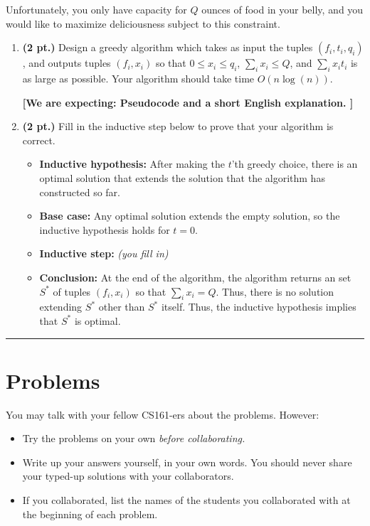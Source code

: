\documentclass{article}
\newcommand{\expecting}[1]{\noindent\textbf{[We are expecting: #1]}}
\newcommand{\pts}[1]{\textbf{(#1 pt.)}}
\begin{document}
\begin{enumerate}
Unfortunately, you only have capacity for $Q$ ounces of food in your belly, and you would like to maximize deliciousness subject to this constraint.  

\begin{enumerate}
\item \pts{2} Design a greedy algorithm which takes as input the tuples $(f_i, t_i, q_i)$, and outputs tuples $(f_i, x_i)$ so that $0 \leq x_i \leq q_i$, $\sum_i x_i \leq Q$, and $\sum_i x_i t_i$ is as large as possible.  Your algorithm should take time $O(n\log(n))$.

\expecting{Pseudocode and a short English explanation. }

\item \pts{2} Fill in the inductive step below to prove that your algorithm is correct.

\begin{itemize}
\item \textbf{Inductive hypothesis:} After making the $t$'th greedy choice, there is an optimal solution that extends the solution that the algorithm has constructed so far.
\item \textbf{Base case:} Any optimal solution extends the empty solution, so the inductive hypothesis holds for $t=0$.
\item \textbf{Inductive step:} \em (you fill in) \em
\item \textbf{Conclusion:} At the end of the algorithm, the algorithm returns an set $S^*$ of tuples $(f_i,x_i)$ so that $\sum_i x_i = Q$.  Thus, there is no solution extending $S^*$ other than $S^*$ itself.  Thus, the inductive hypothesis implies that $S^*$ is optimal.
\end{itemize}
\end{enumerate}

\end{enumerate}
\vfill
\noindent
\rule{\linewidth}{0.4pt}
\newpage
\section*{Problems}
You may talk with your fellow CS161-ers about the problems.  However:
\begin{itemize}
	\item Try the problems on your own \em before \em collaborating.
	\item Write up your answers yourself, in your own words.   You should never share your typed-up solutions with your collaborators.
	\item If you collaborated, list the names of the students you collaborated with at the beginning of each problem.
\end{itemize}
\end{document}
